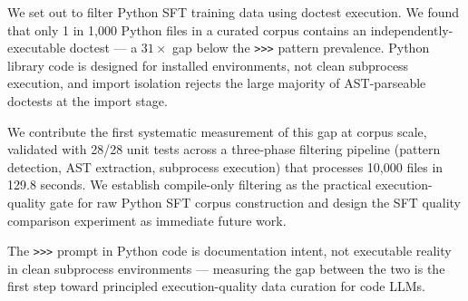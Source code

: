 
We set out to filter Python SFT training data using doctest execution. We found that only
1 in 1,000 Python files in a curated corpus contains an independently-executable doctest ---
a $31\times$ gap below the \texttt{>>>} pattern prevalence. Python library code is designed for installed
environments, not clean subprocess execution, and import isolation rejects the large majority
of AST-parseable doctests at the import stage.

We contribute the first systematic measurement of this gap at corpus scale, validated with
28/28 unit tests across a three-phase filtering pipeline (pattern detection, AST extraction,
subprocess execution) that processes 10,000 files in 129.8 seconds. We establish compile-only
filtering as the practical execution-quality gate for raw Python SFT corpus construction and
design the SFT quality comparison experiment as immediate future work.

The \texttt{>>>} prompt in Python code is documentation intent, not executable reality in clean
subprocess environments --- measuring the gap between the two is the first step toward
principled execution-quality data curation for code LLMs.

